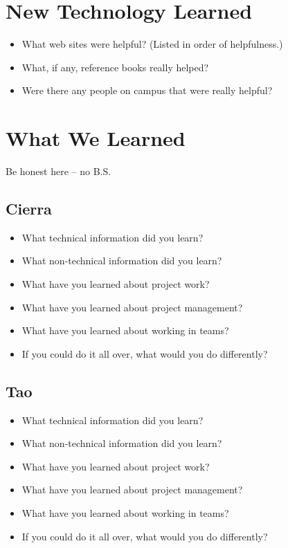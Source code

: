 \documentclass{article}
\begin{document}
\section{New Technology Learned}
\begin{itemize}
    \item What web sites were helpful? (Listed in order of helpfulness.)
    \item What, if any, reference books really helped?
    \item Were there any people on campus that were really helpful?
\end{itemize}

\section{What We Learned}
Be honest here -- no B.S.

\subsection{Cierra}
\begin{itemize}
    \item What technical information did you learn?
    \item What non-technical information did you learn?
    \item What have you learned about project work?
    \item What have you learned about project management?
    \item What have you learned about working in teams?
    \item If you could do it all over, what would you do differently?
\end{itemize}

\subsection{Tao}
\begin{itemize}
    \item What technical information did you learn?
    \item What non-technical information did you learn?
    \item What have you learned about project work?
    \item What have you learned about project management?
    \item What have you learned about working in teams?
    \item If you could do it all over, what would you do differently?
\end{itemize}
\end{document}
